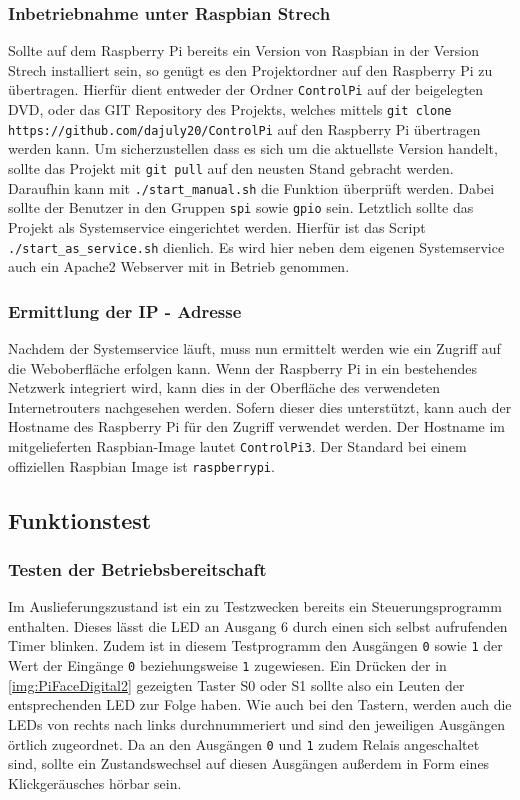  \subsubsection{Inbetriebnahme unter Raspbian Strech}
 Sollte auf dem Raspberry Pi bereits ein Version von Raspbian in der Version Strech installiert sein, so genügt es den Projektordner auf den Raspberry Pi zu übertragen. Hierfür dient entweder der Ordner \texttt{ControlPi} auf der beigelegten DVD, oder das GIT Repository des Projekts, welches mittels  \texttt{git clone https://github.com/dajuly20/ControlPi} auf den Raspberry Pi übertragen werden kann. Um sicherzustellen dass es sich um die aktuellste Version handelt, sollte das Projekt mit \texttt{git pull} auf den neusten Stand gebracht werden. Daraufhin kann mit \texttt{./start\_manual.sh} die Funktion überprüft werden. Dabei sollte der Benutzer in den Gruppen \texttt{spi} sowie \texttt{gpio} sein. Letztlich sollte das Projekt als Systemservice eingerichtet werden. Hierfür ist das Script \texttt{./start\_as\_service.sh} dienlich. Es wird hier neben dem eigenen Systemservice auch ein Apache2 Webserver mit in Betrieb genommen.
 \subsubsection{Ermittlung der IP - Adresse}\label{chp:ausw:ip}
 Nachdem der Systemservice läuft, muss nun ermittelt werden wie ein Zugriff auf die Weboberfläche erfolgen kann. Wenn der Raspberry Pi in ein bestehendes Netzwerk integriert wird, kann dies in der Oberfläche des verwendeten Internetrouters nachgesehen werden. Sofern dieser dies unterstützt, kann auch der Hostname des Raspberry Pi für den Zugriff verwendet werden. Der Hostname im mitgelieferten Raspbian-Image lautet \texttt{ControlPi3}. Der Standard bei einem offiziellen Raspbian Image ist \texttt{raspberrypi}. 
 \subsection{Funktionstest}
 \subsubsection{Testen der Betriebsbereitschaft}
 Im Auslieferungszustand ist ein zu Testzwecken bereits ein Steuerungsprogramm enthalten. Dieses lässt die LED an Ausgang 6 durch einen sich selbst aufrufenden Timer blinken. Zudem ist in diesem Testprogramm den Ausgängen \texttt{0} sowie \texttt{1} der Wert der Eingänge \texttt{0} beziehungsweise \texttt{1} zugewiesen. Ein Drücken der in \autoref{img:PiFaceDigital2} gezeigten Taster S0 oder S1 sollte also ein Leuten der entsprechenden LED zur Folge haben. Wie auch bei den Tastern, werden auch die LEDs von rechts nach links durchnummeriert und sind den jeweiligen Ausgängen örtlich zugeordnet. Da an den Ausgängen \texttt{0} und \texttt{1} zudem Relais angeschaltet sind, sollte ein Zustandswechsel auf diesen Ausgängen außerdem in Form eines Klickgeräusches hörbar sein. 

